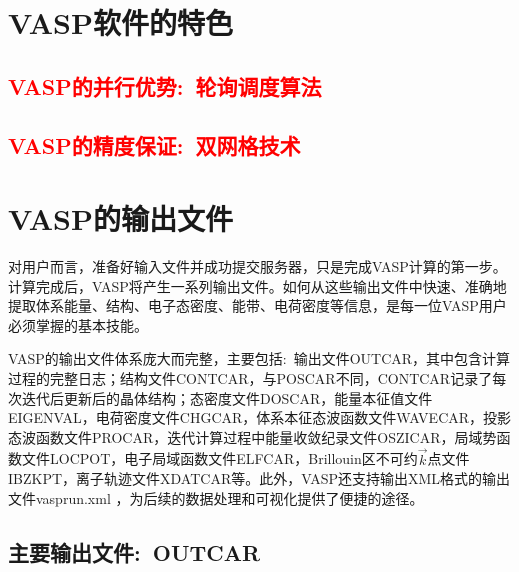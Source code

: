 \section{\rm{VASP}软件的特色}
\subsection{\textcolor{red}{\rm{VASP}的并行优势:~轮询调度算法}}
\subsection{\textcolor{red}{\rm{VASP}的精度保证:~双网格技术}}

\section{\rm{VASP}的输出文件}
对用户而言，准备好输入文件并成功提交服务器，只是完成\textrm{VASP}计算的第一步。计算完成后，\textrm{VASP}将产生一系列输出文件。如何从这些输出文件中快速、准确地提取体系能量、结构、电子态密度、能带、电荷密度等信息，是每一位\textrm{VASP}用户必须掌握的基本技能。

\textrm{VASP}的输出文件体系庞大而完整，主要包括:~输出文件\textrm{OUTCAR}，其中包含计算过程的完整日志；结构文件\textrm{CONTCAR}，与\textrm{POSCAR}不同，\textrm{CONTCAR}记录了每次迭代后更新后的晶体结构；态密度文件\textrm{DOSCAR}，能量本征值文件\textrm{EIGENVAL}，电荷密度文件\textrm{CHGCAR}，体系本征态波函数文件\textrm{WAVECAR}，投影态波函数文件\textrm{PROCAR}，迭代计算过程中能量收敛纪录文件\textrm{OSZICAR}，局域势函数文件\textrm{LOCPOT}，电子局域函数文件\textrm{ELFCAR}，\textrm{Brillouin}区不可约$\vec k$点文件\textrm{IBZKPT}，离子轨迹文件\textrm{XDATCAR}等。此外，\textrm{VASP}还支持输出\textrm{XML}格式的输出文件\textrm{vasprun.xml}%
，为后续的数据处理和可视化提供了便捷的途径。

\subsection{主要输出文件:~\rm{OUTCAR}}



